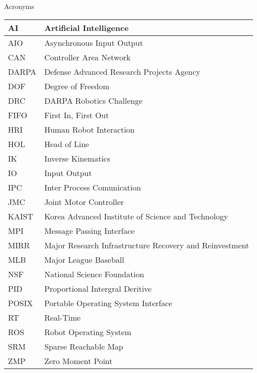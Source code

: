 \Large
\centering
Acronyms\\
\normalsize
\begin{tabular}{l | l}
\hline
AI & Artificial Intelligence\\
\hline
AIO & Asynchronous Input Output\\
\hline
CAN & Controller Area Network \\
\hline
DARPA  &  Defense Advanced Research Projects Agency\\
\hline 
DOF & Degree of Freedom \\
\hline
DRC  & DARPA Robotics Challenge \\
\hline
FIFO & First In, First Out\\
\hline
HRI & Human Robot Interaction\\
\hline
HOL & Head of Line\\
\hline
IK & Inverse Kinematics\\ 
\hline
IO & Input Output\\
\hline
IPC & Inter Process Comunication \\
\hline
JMC & Joint Motor Controller\\
\hline
KAIST & Korea Advanced Institute of Science and Technology \\
\hline
MPI & Message Passing Interface\\
\hline
MIRR & Major Research Infrastructure Recovery and Reinvestment\\
\hline
MLB & Major League Baseball\\
\hline
NSF & National Science Foundation \\
\hline
PID & Proportional Intergral Deritive\\
\hline
POSIX & Portable Operating System Interface\\
\hline
RT & Real-Time\\
\hline
ROS & Robot Operating System\\
\hline
SRM & Sparse Reachable Map \\
\hline 
ZMP & Zero Moment Point\\
\hline
\end{tabular}
